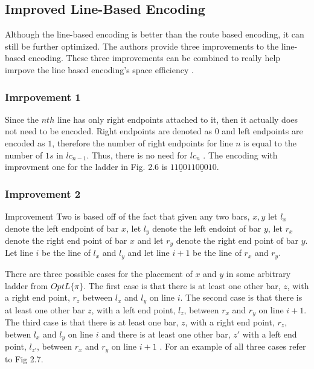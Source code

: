 \subsection{Improved Line-Based Encoding}
Although the line-based encoding is better than the route based 
encoding, it can still be further optimized. The authors provide 
three improvements to the line-based encoding. These three improvements
can be combined to really help imrpove the line based encoding's 
space efficiency \cite{A5}. 
\subsubsection{Imrpovement 1}
Since the $nth$ line has only right endpoints attached to it, 
then it actually does not need to be encoded. Right endpoints 
are denoted as $0$ and left endpoints are encoded as $1$, therefore the number of right endpoints 
for line $n$ is equal to the number of $1s$ in $lc_{n-1}$.
Thus, there is no need for $lc_{n}$ \cite{A5}. The encoding with improvment 
one for the ladder in Fig. 2.6 is $11\underline{0}0110\underline{0}010$.
\subsubsection{Improvement 2}
Improvement Two is based off of the fact that given any two bars,
$x,y$ let $l_{x}$ denote the left endpoint of bar $x$, let 
$l_{y}$ denote the left endoint of bar $y$, let $r_{x}$ denote 
the right end point of bar $x$ and let $r_{y}$ denote the right 
end point of bar $y$. Let line $i$ be the line of $l_{x}$ and $l_{y}$
and let line $i+1$ be the line of $r_{x}$ and $r_{y}$.
\begin{theorem}
There are three possible cases for the 
placement of $x$ and $y$ in some 
arbitrary ladder from $OptL\{\pi\}$. The first case is that there 
is at least one other bar, $z$, with a right end point, $r_{z}$ between $l_{x}$
and $l_{y}$ on line $i$. The second case is that there is at least one other bar 
$z$, with a left end point, $l_{z}$, between $r_{x}$ and $r_{y}$ on line $i+1$. 
The third case is that there is at least one bar, $z$, with a right end point, 
$r_{z}$, betwen $l_{x}$ and $l_{y}$ on line $i$ and there is at least one other bar, 
$z\prime$ with a left end point, $l_{z\prime}$, between $r_{x}$ and $r_{y}$ on line $i+1$ \cite{A5}. 
For an example of all three cases refer to Fig 2.7.\par
\end{theorem}

